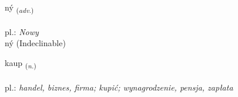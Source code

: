 \documentclass[frontgrid, backgrid]{flacards}\usepackage[]{graphicx}\usepackage[]{xcolor}
\begin{document}

\renewcommand{\flhead}{\vskip5pt \fboxsep=0pt {\small\bfseries\footnotesize Atviksorð | Adverb}}
\renewcommand{\fcfoot}{\vskip5pt \fboxsep=0pt \hspace{2pt}{\small\bfseries\footnotesize 1K}}

\renewcommand{\blhead}{\vskip5pt {\small\bfseries\footnotesize Atviksorð | Adverb }}
\renewcommand{\bcfoot}{\vskip5pt \hspace{2pt}{\small\bfseries\footnotesize 1K}}


{ný \small{\textsubscript{(\textit{adv.})}} \\[1ex]
\textphonetic{[niː]} \\
pl.: \emph{Nowy} \\  [2ex]
ný (Indeclinable)}

\renewcommand{\flhead}{\vskip5pt \fboxsep=0pt {\small\bfseries\footnotesize Nafnorð | Noun}}
\renewcommand{\fcfoot}{\vskip5pt \fboxsep=0pt \hspace{2pt}{\small\bfseries\footnotesize 1K}}

\renewcommand{\blhead}{\vskip5pt {\small\bfseries\footnotesize Nafnorð | Noun }}
\renewcommand{\bcfoot}{\vskip5pt \hspace{2pt}{\small\bfseries\footnotesize 1K}}


{kaup \small{\textsubscript{(\textit{n.})}} \\[1ex] %
\textphonetic{[kʰœiːp]} \\
pl.: \emph{handel, biznes, firma; kupić; wynagrodzenie, pensja, zapłata} \\  [2ex]
\renewcommand*{\arraystretch}{0.8}
}

\renewcommand{\flhead}{\vskip5pt \fboxsep=0pt {\small\bfseries\footnotesize Nafnorð | Noun}}
\renewcommand{\fcfoot}{\vskip5pt \fboxsep=0pt \hspace{2pt}{\small\bfseries\footnotesize 1K}}
\end{document}
